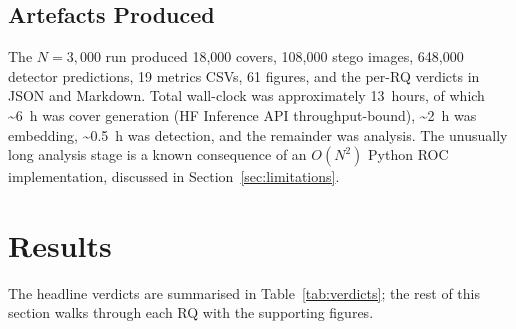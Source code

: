 \documentclass[10pt,twocolumn,a4paper]{article}
\begin{document}
\subsection{Artefacts Produced}
The $N\!=\!3{,}000$ run produced 18{,}000 covers, 108{,}000 stego images, 648{,}000 detector predictions, 19 metrics CSVs, 61 figures, and the per-RQ verdicts in JSON and Markdown. Total wall-clock was approximately 13~hours, of which \textasciitilde6~h was cover generation (HF Inference API throughput-bound), \textasciitilde2~h was embedding, \textasciitilde0.5~h was detection, and the remainder was analysis. The unusually long analysis stage is a known consequence of an $O(N^2)$ Python ROC implementation, discussed in Section~\ref{sec:limitations}.

\section{Results}
\label{sec:results}

The headline verdicts are summarised in Table~\ref{tab:verdicts}; the rest of this section walks through each RQ with the supporting figures.
\end{document}
